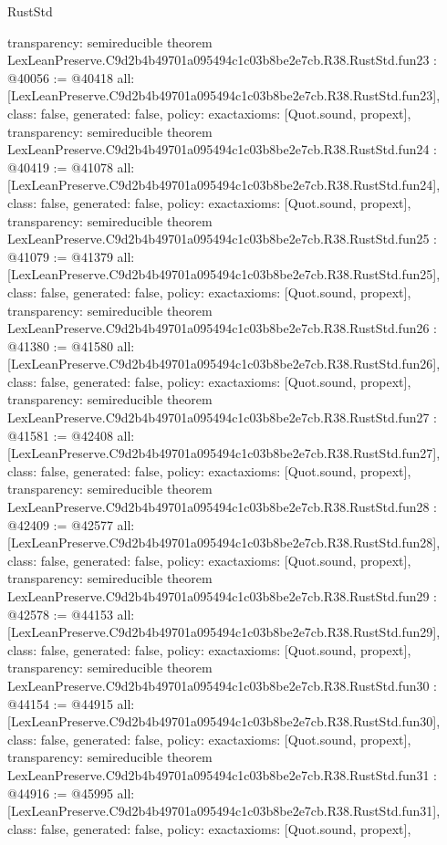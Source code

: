 \begin{lexlean}{RustStd}
\begin{coremodule}
{  transparency: semireducible
}
theorem LexLeanPreserve.C9d2b4b49701a095494c1c03b8be2e7cb.R38.RustStd.fun23 : @40056 := @40418 {
  all: [LexLeanPreserve.C9d2b4b49701a095494c1c03b8be2e7cb.R38.RustStd.fun23],
  class: false,
  generated: false,
  policy: exact{axioms: [Quot.sound, propext]},
  transparency: semireducible
}
theorem LexLeanPreserve.C9d2b4b49701a095494c1c03b8be2e7cb.R38.RustStd.fun24 : @40419 := @41078 {
  all: [LexLeanPreserve.C9d2b4b49701a095494c1c03b8be2e7cb.R38.RustStd.fun24],
  class: false,
  generated: false,
  policy: exact{axioms: [Quot.sound, propext]},
  transparency: semireducible
}
theorem LexLeanPreserve.C9d2b4b49701a095494c1c03b8be2e7cb.R38.RustStd.fun25 : @41079 := @41379 {
  all: [LexLeanPreserve.C9d2b4b49701a095494c1c03b8be2e7cb.R38.RustStd.fun25],
  class: false,
  generated: false,
  policy: exact{axioms: [Quot.sound, propext]},
  transparency: semireducible
}
theorem LexLeanPreserve.C9d2b4b49701a095494c1c03b8be2e7cb.R38.RustStd.fun26 : @41380 := @41580 {
  all: [LexLeanPreserve.C9d2b4b49701a095494c1c03b8be2e7cb.R38.RustStd.fun26],
  class: false,
  generated: false,
  policy: exact{axioms: [Quot.sound, propext]},
  transparency: semireducible
}
theorem LexLeanPreserve.C9d2b4b49701a095494c1c03b8be2e7cb.R38.RustStd.fun27 : @41581 := @42408 {
  all: [LexLeanPreserve.C9d2b4b49701a095494c1c03b8be2e7cb.R38.RustStd.fun27],
  class: false,
  generated: false,
  policy: exact{axioms: [Quot.sound, propext]},
  transparency: semireducible
}
theorem LexLeanPreserve.C9d2b4b49701a095494c1c03b8be2e7cb.R38.RustStd.fun28 : @42409 := @42577 {
  all: [LexLeanPreserve.C9d2b4b49701a095494c1c03b8be2e7cb.R38.RustStd.fun28],
  class: false,
  generated: false,
  policy: exact{axioms: [Quot.sound, propext]},
  transparency: semireducible
}
theorem LexLeanPreserve.C9d2b4b49701a095494c1c03b8be2e7cb.R38.RustStd.fun29 : @42578 := @44153 {
  all: [LexLeanPreserve.C9d2b4b49701a095494c1c03b8be2e7cb.R38.RustStd.fun29],
  class: false,
  generated: false,
  policy: exact{axioms: [Quot.sound, propext]},
  transparency: semireducible
}
theorem LexLeanPreserve.C9d2b4b49701a095494c1c03b8be2e7cb.R38.RustStd.fun30 : @44154 := @44915 {
  all: [LexLeanPreserve.C9d2b4b49701a095494c1c03b8be2e7cb.R38.RustStd.fun30],
  class: false,
  generated: false,
  policy: exact{axioms: [Quot.sound, propext]},
  transparency: semireducible
}
theorem LexLeanPreserve.C9d2b4b49701a095494c1c03b8be2e7cb.R38.RustStd.fun31 : @44916 := @45995 {
  all: [LexLeanPreserve.C9d2b4b49701a095494c1c03b8be2e7cb.R38.RustStd.fun31],
  class: false,
  generated: false,
  policy: exact{axioms: [Quot.sound, propext]},
}
\end{coremodule}
\end{lexlean}
